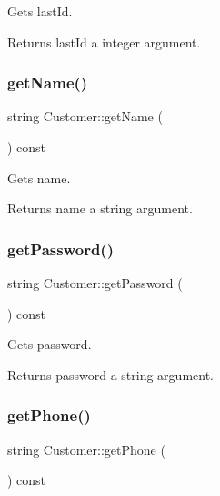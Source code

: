 Gets last\+Id. 

\begin{DoxyReturn}{Returns}
last\+Id a integer argument. 
\end{DoxyReturn}
\mbox{\label{classCustomer_ac987a032179493e7a75b3dbdc32c1cf9}} 
\subsubsection{\texorpdfstring{get\+Name()}{getName()}}
{\footnotesize\ttfamily string Customer\+::get\+Name (\begin{DoxyParamCaption}{ }\end{DoxyParamCaption}) const}



Gets name. 

\begin{DoxyReturn}{Returns}
name a string argument. 
\end{DoxyReturn}
\mbox{\label{classCustomer_aec5721d16ce287c363cc1aacf5f962fd}} 
\subsubsection{\texorpdfstring{get\+Password()}{getPassword()}}
{\footnotesize\ttfamily string Customer\+::get\+Password (\begin{DoxyParamCaption}{ }\end{DoxyParamCaption}) const}



Gets password. 

\begin{DoxyReturn}{Returns}
password a string argument. 
\end{DoxyReturn}
\mbox{\label{classCustomer_ac34eaf091e758c7f8c89f86af2dc29f1}} 
\subsubsection{\texorpdfstring{get\+Phone()}{getPhone()}}
{\footnotesize\ttfamily string Customer\+::get\+Phone (\begin{DoxyParamCaption}{ }\end{DoxyParamCaption}) const}




